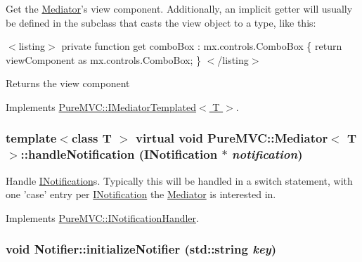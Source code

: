 Get the {\ttfamily \hyperlink{class_pure_m_v_c_1_1_mediator}{Mediator}}'s view component. Additionally, an implicit getter will usually be defined in the subclass that casts the view object to a type, like this:

$<$listing$>$ private function get comboBox : mx.controls.ComboBox \{ return viewComponent as mx.controls.ComboBox; \} $<$/listing$>$

\begin{DoxyReturn}{Returns}
the view component 
\end{DoxyReturn}


Implements \hyperlink{class_pure_m_v_c_1_1_i_mediator_templated_a985393a359ef8643a577b34e81374dc6}{PureMVC::IMediatorTemplated$<$ T $>$}.\hypertarget{class_pure_m_v_c_1_1_mediator_a869785c4f70518e40eaae7395c5f1d48}{
\subsubsection[{handleNotification}]{\setlength{\rightskip}{0pt plus 5cm}template$<$class T $>$ virtual void {\bf PureMVC::Mediator}$<$ T $>$::handleNotification ({\bf INotification} $\ast$ {\em notification})}}
\label{class_pure_m_v_c_1_1_mediator_a869785c4f70518e40eaae7395c5f1d48}


Handle {\ttfamily \hyperlink{class_pure_m_v_c_1_1_i_notification}{INotification}}s. Typically this will be handled in a switch statement, with one 'case' entry per {\ttfamily \hyperlink{class_pure_m_v_c_1_1_i_notification}{INotification}} the {\ttfamily \hyperlink{class_pure_m_v_c_1_1_mediator}{Mediator}} is interested in. 

Implements \hyperlink{class_pure_m_v_c_1_1_i_notification_handler_af31efbe0929caff0ac371bf45d3e9c50}{PureMVC::INotificationHandler}.\hypertarget{class_pure_m_v_c_1_1_notifier_a6910365c70415ba7973401215f57e4af}{
\subsubsection[{initializeNotifier}]{\setlength{\rightskip}{0pt plus 5cm}void Notifier::initializeNotifier (std::string {\em key})}}
\label{class_pure_m_v_c_1_1_notifier_a6910365c70415ba7973401215f57e4af}


